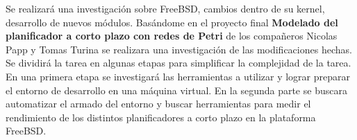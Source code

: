 \documentclass[a4paper, 15pt]{article}
\begin{document}
\vspace{0.4cm}
\large
\begin{flushleft}
Se realizará una investigación sobre FreeBSD, cambios dentro de su kernel, desarrollo de nuevos módulos. Basándome en el proyecto final \textbf{Modelado del planificador a corto plazo con redes de Petri} de los compañeros Nicolas Papp y Tomas Turina se realizara una investigación de las modificaciones hechas. Se dividirá la tarea en algunas etapas para simplificar la complejidad de la tarea.
En una primera etapa se investigará las herramientas a utilizar y lograr preparar el entorno de desarrollo en una máquina virtual. En la segunda parte se buscara automatizar el armado del entorno y buscar herramientas para medir el rendimiento de los distintos planificadores a corto plazo en la plataforma FreeBSD.

\end{flushleft}
\newpage
\end{document}
